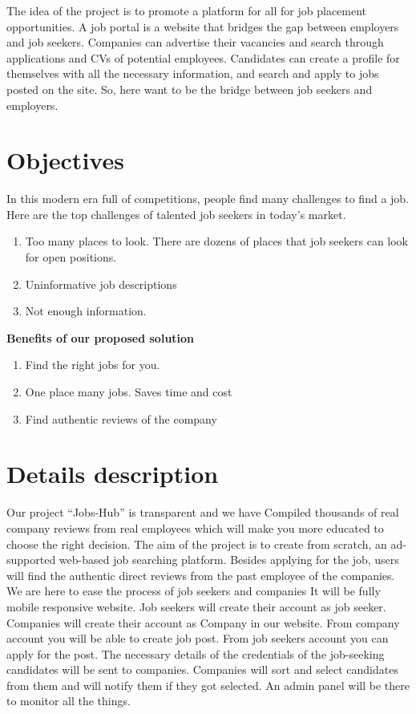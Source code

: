\documentclass[11pt]{report}
\begin{document}
The idea of the project is to promote a platform for all for job placement opportunities. A job
portal is a website that bridges the gap between employers and job seekers. Companies can
advertise their vacancies and search through applications and CVs of potential employees.
Candidates can create a profile for themselves with all the necessary information, and search
and apply to jobs posted on the site. So, here want to be the bridge between job seekers and
employers.


\section*{Objectives}



In this modern era full of competitions, people find many challenges to find a job.
Here are the top challenges of talented job seekers in today's market.

\begin{enumerate}
  \item Too many places to look. There are dozens of places that job seekers can look for open positions. 
  \item Uninformative job descriptions
  \item Not enough information.
\end{enumerate}

\textbf{ Benefits of our proposed solution }
\begin{enumerate}
  \item Find the right jobs for you. 
  \item One place many jobs. Saves time and cost
  \item Find authentic reviews of the company
\end{enumerate}


\section*{Details description}

Our project “Jobs-Hub” is transparent and we have Compiled thousands of real company reviews from real employees which will make you more educated to choose the right decision. The aim of the project is to create from scratch, an ad-supported web-based job searching platform. Besides applying for the job, 
users will find the authentic direct reviews from the past employee of the companies. We are here to ease the process of job seekers and companies
It will be fully mobile responsive website. Job seekers will create their account as job seeker. Companies will create their account as Company in our website. From company account you will be able to create job post. From job seekers account you can apply for the post. The necessary details of the credentials of the job-seeking candidates will be sent to companies. Companies will sort and select candidates from them and will notify them if they got selected. An admin panel will be there to monitor all the things.
\end{document}
